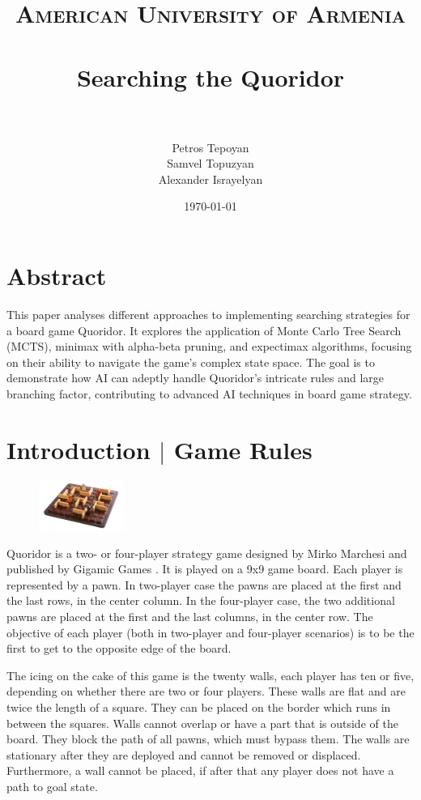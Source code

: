 \documentclass{article}
\title{	
\normalfont \normalsize 
\textsc{American University of Armenia} \\ [25pt] %
\horrule{0.5pt} \\[0.4cm] %
\huge Searching the Quoridor\\ %
\horrule{2pt} \\[0.5cm] %
}
\author{
	Petros Tepoyan \\
	Samvel Topuzyan \\
	Alexander Israyelyan } %
\date{\normalsize\today} %
\begin{document}
\maketitle

\section*{Abstract} \indent

	This paper analyses different approaches to implementing searching strategies for a board game Quoridor. It explores the application of Monte Carlo Tree Search (MCTS), minimax with alpha-beta pruning, and expectimax algorithms, focusing on their ability to navigate the game's complex state space. The goal is to demonstrate how AI can adeptly handle Quoridor's intricate rules and large branching factor, contributing to advanced AI techniques in board game strategy.


\tableofcontents

\section{Introduction $|$ Game Rules } \indent

	\begin{figure} %
	    \centering
	    \includegraphics[width=0.25\textwidth]{game}
	\end{figure}

	Quoridor is a two- or four-player strategy game designed by Mirko Marchesi and published by Gigamic Games \cite{Wikipedia_Quoridor}. It is played on a 9x9 game board. Each player is represented by a pawn. In two-player case the pawns are placed at the first and the last rows, in the center column. In the four-player case, the two additional pawns are placed at the first and the last columns, in the center row. The objective of each player (both in two-player and four-player scenarios) is to be the first to get to the opposite edge of the board. \cite{ai_agent} 
	
	The icing on the cake of this game is the twenty walls, each player has ten or five, depending on whether there are two or four players. These walls are flat and are twice the length of a square. They can be placed on the border which runs in between the squares. Walls cannot overlap or have a part that is outside of the board. They block the path of all pawns, which must bypass them. The walls are stationary after they are deployed and cannot be removed or displaced. Furthermore, a wall cannot be placed, if after that any player does not have a path to goal state.
	
\end{document}
